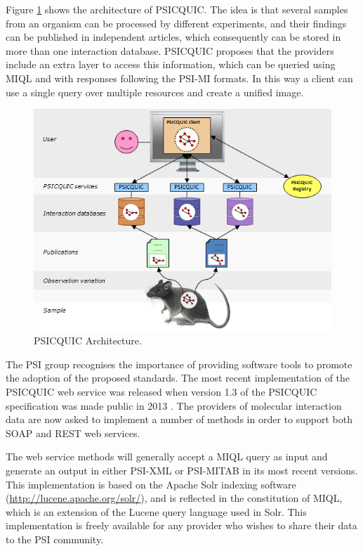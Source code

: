 Figure \ref{fig:psicquic} shows the architecture of PSICQUIC. The idea is that several samples from an organism can be processed by different experiments, and their findings can be published in independent articles, which consequently can be stored in more than one interaction database. PSICQUIC proposes that the providers include an extra layer to access this information, which can be queried using MIQL and with responses following the PSI-MI formats. In this way a client can use a single query over multiple resources and create a unified image.

\begin{figure}  
\centering
\includegraphics[width=4.5in]{figures/psicquic.png}
\caption[PSICQUIC Architecture.]{PSICQUIC Architecture.
\label{fig:psicquic}}
\end{figure}

The PSI group recognises the importance of providing software tools to promote the adoption of the proposed standards. The most recent implementation of the PSICQUIC web service was released when version 1.3 of the PSICQUIC specification was made public in 2013 \cite{DEL2013}. The providers of molecular interaction data are now asked to implement a number of methods in order to support both SOAP and REST web services. 

The web service methods will generally accept a MIQL query as input and generate an output in either PSI-XML or PSI-MITAB in its most recent versions. This implementation is based on the Apache Solr indexing software (\url{http://lucene.apache.org/solr/}), and is reflected in the constitution of MIQL, which is an extension of the Lucene query language used in Solr. This implementation is freely available for any provider who wishes to share their data to the PSI community.


